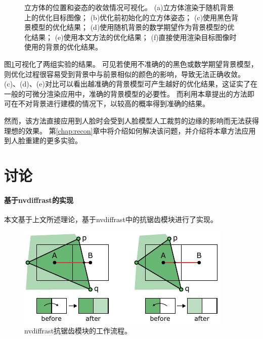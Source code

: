 \begin{figure}
    \caption[立方体的位置和姿态的收敛情况可视化]{
        立方体的位置和姿态的收敛情况可视化。
        (a)立方体渲染于随机背景上的优化目标图像；
        (b)优化前初始化的立方体姿态；
        (c)使用黑色背景模型的优化结果；
        (d)使用随机背景的数学期望作为背景模型的优化结果；
        (e)使用本文方法的优化结果；
        (f)直接使用渲染目标图像时使用的背景的优化结果。
    }
    \label{fig:cube_opt_vis}
\end{figure}
图\ref{fig:cube_opt_vis}可视化了两组实验的结果。
可见若使用不准确的的黑色或数学期望背景模型，则优化过程很容易受到背景中与前景相似的颜色的影响，导致无法正确收敛。
(c)、(d)、(e)对比可以看出越准确的背景模型可产生越好的优化结果，这证实了在一般的可微分渲染应用中，准确的背景模型的必要性。
而利用本章提出的方法即可在不对背景进行建模的情况下，以较高的概率得到准确的结果。

然而，该方法直接应用到人脸时会受到人脸模型人工裁剪的边缘的影响而无法获得理想的效果。
第\ref{chap:recon}章中将介绍如何解决该问题，并介绍将本章方法应用到人脸重建的更多实验。

\section{讨论}
\label{sec:method_discuss}

\paragraph{基于nvdiffrast的实现}
本文基于上文所述理论，基于nvdiffrast\citep{nvdiffrast}中的抗锯齿模块进行了实现。

\begin{figure}[ht]
    \centering
    \includegraphics{figures/antialias}
    \caption[nvdiffrast抗锯齿模块的工作流程]{nvdiffrast抗锯齿模块的工作流程\citep{nvdiffrast}。}
    \label{fig:aa}
\end{figure}

